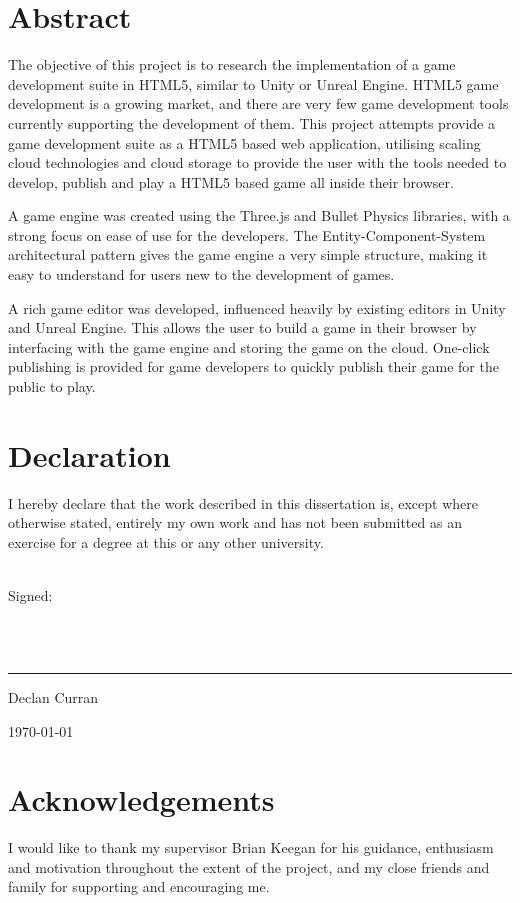 \chapter*{Abstract}

The objective of this project is to research the implementation of a game development suite in HTML5, similar to Unity or Unreal Engine. HTML5 game development is a growing market, and there are very few game development tools currently supporting the development of them. This project attempts provide a game development suite as a HTML5 based web application, utilising scaling cloud technologies and cloud storage to provide the user with the tools needed to develop, publish and play a HTML5 based game all inside their browser. 

A game engine was created using the Three.js and Bullet Physics libraries, with a strong focus on ease of use for the developers. The Entity-Component-System architectural pattern gives the game engine a very simple structure, making it easy to understand for users new to the development of games.

A rich game editor was developed, influenced heavily by existing editors in Unity and Unreal Engine. This allows the user to build a game in their browser by interfacing with the game engine and storing the game on the cloud. One-click publishing is provided for game developers to quickly publish their game for the public to play.

\chapter*{Declaration}
I hereby declare that the work described in this dissertation is, except where otherwise stated, entirely my own work and has not been submitted as an exercise for a degree at this or any other university.

~\\
Signed:

~\\
~\\
\rule{8cm}{0.4pt}

Declan Curran

\today

\chapter*{Acknowledgements}
I would like to thank my supervisor Brian Keegan for his guidance, enthusiasm and motivation throughout the extent of the project, and my close friends and family for supporting and encouraging me.
